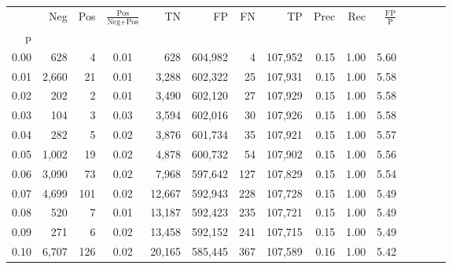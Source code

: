 \begin{tabular}{rrrcrrrrrrrrrrr}
\toprule
{} &     Neg &    Pos & $\frac{\text{Pos}}{\text{Neg}+\text{Pos}}$ &       TN &       FP &       FN &       TP &  Prec &   Rec & $\frac{\text{FP}}{\text{P}}$ \\
p    &         &        &                                            &          &          &          &          &       &       &                              \\
\midrule
0.00 &     628 &      4 &                                       0.01 &      628 &  604,982 &        4 &  107,952 &  0.15 &  1.00 &                         5.60 \\
0.01 &   2,660 &     21 &                                       0.01 &    3,288 &  602,322 &       25 &  107,931 &  0.15 &  1.00 &                         5.58 \\
0.02 &     202 &      2 &                                       0.01 &    3,490 &  602,120 &       27 &  107,929 &  0.15 &  1.00 &                         5.58 \\
0.03 &     104 &      3 &                                       0.03 &    3,594 &  602,016 &       30 &  107,926 &  0.15 &  1.00 &                         5.58 \\
0.04 &     282 &      5 &                                       0.02 &    3,876 &  601,734 &       35 &  107,921 &  0.15 &  1.00 &                         5.57 \\
0.05 &   1,002 &     19 &                                       0.02 &    4,878 &  600,732 &       54 &  107,902 &  0.15 &  1.00 &                         5.56 \\
0.06 &   3,090 &     73 &                                       0.02 &    7,968 &  597,642 &      127 &  107,829 &  0.15 &  1.00 &                         5.54 \\
0.07 &   4,699 &    101 &                                       0.02 &   12,667 &  592,943 &      228 &  107,728 &  0.15 &  1.00 &                         5.49 \\
0.08 &     520 &      7 &                                       0.01 &   13,187 &  592,423 &      235 &  107,721 &  0.15 &  1.00 &                         5.49 \\
0.09 &     271 &      6 &                                       0.02 &   13,458 &  592,152 &      241 &  107,715 &  0.15 &  1.00 &                         5.49 \\
0.10 &   6,707 &    126 &                                       0.02 &   20,165 &  585,445 &      367 &  107,589 &  0.16 &  1.00 &                         5.42 \\

\end{tabular}
